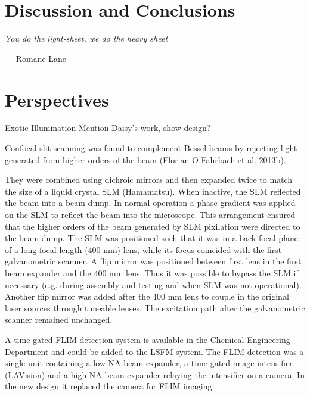 \ifpdf
    \graphicspath{{Chapters/conclusions/Figs/Raster/}{Chapters/conclusions/Figs/PDF/}{Chapters/conclusions/Figs/}}
\else
    \graphicspath{{Chapters/conclusions/Figs/Vector/}{Chapters/conclusions/Figs/}}
\fi

\chapter{Discussion and Conclusions}\label{chapter:conclusions}

\epigraph{\emph{You do the light-sheet, we do the heavy sheet}}{--- Romane Lane}

\chapter{Perspectives}
Exotic Illumination
  Mention Daisy's work, show design?

  Confocal slit scanning was found to complement Bessel beams by rejecting light generated from higher orders of the beam (Florian O Fahrbach et al. 2013b).

    They were combined using dichroic mirrors and then expanded twice to match the size of a liquid crystal SLM (Hamamatsu).
    When inactive, the SLM reflected the beam into a beam dump.
    In normal operation a phase gradient was applied on the SLM to reflect the beam into the microscope.
    This arrangement ensured that the higher orders of the beam generated by SLM pixilation were directed to the beam dump.
    The SLM was positioned such that it was in a back focal plane of a long focal length (400 mm) lens, while its focus coincided with the first galvanometric scanner.
    A flip mirror was positioned between first lens in the first beam expander and the 400 mm lens.
    Thus it was possible to bypass the SLM if necessary (e.g. during assembly and testing and when SLM was not operational).
    Another flip mirror was added after the 400 mm lens to couple in the original laser sources through tuneable lenses.
     The excitation path after the galvanometric scanner remained unchanged.

  A time-gated FLIM detection system is available in the Chemical Engineering Department and could be added to the LSFM system.
  The FLIM detection was a single unit containing a low NA beam expander, a time gated image intensifier (LAVision) and a high NA beam expander relaying the intensifier on a camera.
  In the new design it replaced the camera for FLIM imaging.


